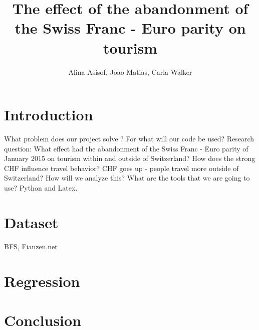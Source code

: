 \documentclass[11pt]{amsart}
\title{The effect of the abandonment of the Swiss Franc - Euro parity on tourism}
\author{Alina Asisof, Joao Matias, Carla Walker}
\begin{document}
\maketitle
\newpage
\tableofcontents

\newpage
\section{Introduction}
\newcommand{\package}{\emph}


What problem does our project solve ? 
For what will our code be used? 
Research question: What effect had the abandonment of the Swiss Franc - Euro parity of January 2015 on tourism within and outside of Switzerland? 
How does the strong CHF influence travel behavior? 
CHF goes up - people travel more outside of Switzerland? 
How will we analyze this? 
What are the tools that we are going to use? Python and Latex. 


\newpage
\section{Dataset}

BFS, Fianzen.net

\newpage
\section{Regression}

\newpage
\section{Conclusion}
\end{document}
